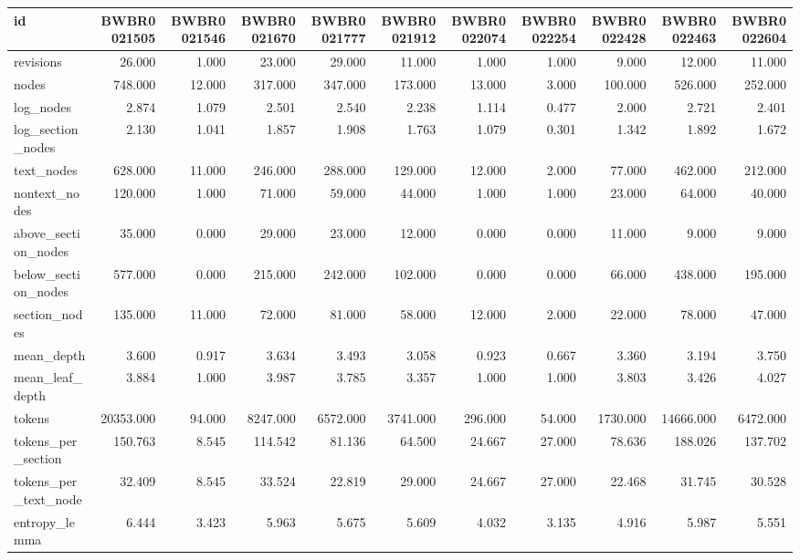 \begin{tabular}{lrrrrrrrrrr}
\toprule
id & BWBR0021505 & BWBR0021546 & BWBR0021670 & BWBR0021777 & BWBR0021912 & BWBR0022074 & BWBR0022254 & BWBR0022428 & BWBR0022463 & BWBR0022604 \\
\midrule
revisions & 26.000 & 1.000 & 23.000 & 29.000 & 11.000 & 1.000 & 1.000 & 9.000 & 12.000 & 11.000 \\
\cline{1-11}
nodes & 748.000 & 12.000 & 317.000 & 347.000 & 173.000 & 13.000 & 3.000 & 100.000 & 526.000 & 252.000 \\
\cline{1-11}
log\_nodes & 2.874 & 1.079 & 2.501 & 2.540 & 2.238 & 1.114 & 0.477 & 2.000 & 2.721 & 2.401 \\
\cline{1-11}
log\_section\_nodes & 2.130 & 1.041 & 1.857 & 1.908 & 1.763 & 1.079 & 0.301 & 1.342 & 1.892 & 1.672 \\
\cline{1-11}
text\_nodes & 628.000 & 11.000 & 246.000 & 288.000 & 129.000 & 12.000 & 2.000 & 77.000 & 462.000 & 212.000 \\
\cline{1-11}
nontext\_nodes & 120.000 & 1.000 & 71.000 & 59.000 & 44.000 & 1.000 & 1.000 & 23.000 & 64.000 & 40.000 \\
\cline{1-11}
above\_section\_nodes & 35.000 & 0.000 & 29.000 & 23.000 & 12.000 & 0.000 & 0.000 & 11.000 & 9.000 & 9.000 \\
\cline{1-11}
below\_section\_nodes & 577.000 & 0.000 & 215.000 & 242.000 & 102.000 & 0.000 & 0.000 & 66.000 & 438.000 & 195.000 \\
\cline{1-11}
section\_nodes & 135.000 & 11.000 & 72.000 & 81.000 & 58.000 & 12.000 & 2.000 & 22.000 & 78.000 & 47.000 \\
\cline{1-11}
mean\_depth & 3.600 & 0.917 & 3.634 & 3.493 & 3.058 & 0.923 & 0.667 & 3.360 & 3.194 & 3.750 \\
\cline{1-11}
mean\_leaf\_depth & 3.884 & 1.000 & 3.987 & 3.785 & 3.357 & 1.000 & 1.000 & 3.803 & 3.426 & 4.027 \\
\cline{1-11}
tokens & 20353.000 & 94.000 & 8247.000 & 6572.000 & 3741.000 & 296.000 & 54.000 & 1730.000 & 14666.000 & 6472.000 \\
\cline{1-11}
tokens\_per\_section & 150.763 & 8.545 & 114.542 & 81.136 & 64.500 & 24.667 & 27.000 & 78.636 & 188.026 & 137.702 \\
\cline{1-11}
tokens\_per\_text\_node & 32.409 & 8.545 & 33.524 & 22.819 & 29.000 & 24.667 & 27.000 & 22.468 & 31.745 & 30.528 \\
\cline{1-11}
entropy\_lemma & 6.444 & 3.423 & 5.963 & 5.675 & 5.609 & 4.032 & 3.135 & 4.916 & 5.987 & 5.551 \\

\end{tabular}
